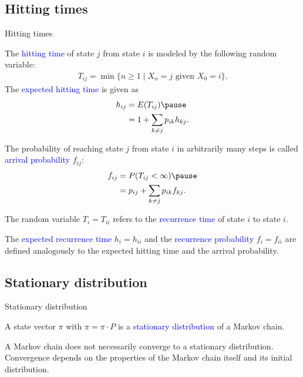 \documentclass{beamer}
\def\padding{\vspace{0.5cm}}
\def\spadding{\vspace{0.25cm}}
\def\b{\textcolor{blue}}
\begin{document}
\subsection{Hitting times}
\begin{frame}{Hitting times}
    \begin{definition}
        The \b{hitting time} of state $j$ from state $i$ is modeled by the following random variable:
        \begin{align*}
            T_{ij} = \min \{n \geq 1 \mid X_n = j \text{ given } X_0 = i\}.
        \end{align*}\pause
        The \b{expected hitting time} is given as
        \begin{align*}
            h_{ij} &= E(T_{ij})\pause \\
                   &= 1 + \sum_{k \neq j} p_{ik} h_{kj}.
        \end{align*}
    \end{definition}
\end{frame}

\begin{frame}
    The probability of reaching state $j$ from state $i$ in arbitrarily many steps is called \b{arrival probability} $f_{ij}$:
    \begin{align*}
        f_{ij} &= P(T_{ij} < \infty)\pause \\
               &= p_{ij} + \sum_{k \neq j} p_{ik} f_{kj}.
    \end{align*}\pause
    \begin{definition}
        The random variable $T_i = T_{ii}$ refers to the \b{recurrence time} of state $i$ to state $i$.\pause\par\spadding
        The \b{expected recurrence time} $h_i = h_{ii}$ and the \b{recurrence probability} $f_i = f_{ii}$ are defined analogously to the expected hitting time and the arrival probability.
    \end{definition}
\end{frame}

\subsection{Stationary distribution}
\begin{frame}{Stationary distribution}
    \begin{definition}
        A state vector $\pi$ with $\pi = \pi \cdot P$ is a \b{stationary distribution} of a Markov chain.
    \end{definition}\par\pause\padding
    A Markov chain does not necessarily converge to a stationary distribution. Convergence depends on the properties of the Markov chain itself and its initial distribution.
\end{frame}
\end{document}
